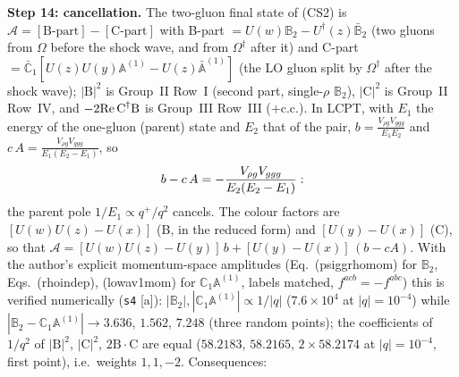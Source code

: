 \documentclass[10pt]{article}
\def\mf#1{\mathbb{#1}}
\begin{document}
\medskip
\noindent\textbf{Step 14: cancellation.} The two-gluon final state of (CS2) is $\mathcal{A}=[\text{B-part}]-[\text{C-part}]$ with B-part $=U(w)\mf{B}_{2}-U^{\dagger}(z)\bar{\mf{B}}_{2}$ (two gluons from $\Omega$ before the shock wave, and from $\Omega^{\dagger}$ after it) and C-part $=\bar{\mf{C}}_{1}[U(z)U(y)\mf{A}^{(1)}-U(z)\bar{\mf{A}}^{(1)}]$ (the LO gluon split by $\Omega^{\dagger}$ after the shock wave); $|\text{B}|^{2}$ is Group~II Row~I (second part, single-$\rho$ $\mf{B}_{2}$), $|\text{C}|^{2}$ is Group~II Row~IV, and $-2{\rm Re}\,\text{C}^{\dagger}\text{B}$ is Group~III Row~III ($+$c.c.). In LCPT, with $E_{1}$ the energy of the one-gluon (parent) state and $E_{2}$ that of the pair, $b=\frac{V_{\rho g}V_{ggg}}{E_{1}E_{2}}$ and $c\,A=\frac{V_{\rho g}V_{ggg}}{E_{1}(E_{2}-E_{1})}$, so
\begin{align}
b-c\,A=-\frac{V_{\rho g}V_{ggg}}{E_{2}(E_{2}-E_{1})}:
\notag
\end{align}
the parent pole $1/E_{1}\propto q^{+}/q^{2}$ cancels. The colour factors are $[U(w)U(z)-U(x)]$ (B, in the reduced form) and $[U(y)-U(x)]$ (C), so that $\mathcal{A}=[U(w)U(z)-U(y)]\,b+[U(y)-U(x)]\,(b-cA)$. With the author's explicit momentum-space amplitudes (Eq.~(psiggrhomom) for $\mf{B}_{2}$, Eqs.~(rhoindep), (lowav1mom) for $\mf{C}_{1}\mf{A}^{(1)}$, labels matched, $f^{acb}=-f^{abc}$) this is verified numerically (\texttt{s4} [a]): $|\mf{B}_{2}|,|\mf{C}_{1}\mf{A}^{(1)}|\propto1/|q|$ ($7.6\times10^{4}$ at $|q|=10^{-4}$) while $|\mf{B}_{2}-\mf{C}_{1}\mf{A}^{(1)}|\to3.636$, $1.562$, $7.248$ (three random points); the coefficients of $1/q^{2}$ of $|\text{B}|^{2}$, $|\text{C}|^{2}$, $2\text{B}\cdot\text{C}$ are equal ($58.2183$, $58.2165$, $2\times58.2174$ at $|q|=10^{-4}$, first point), i.e.\ weights $1,1,-2$. Consequences:
\end{document}
